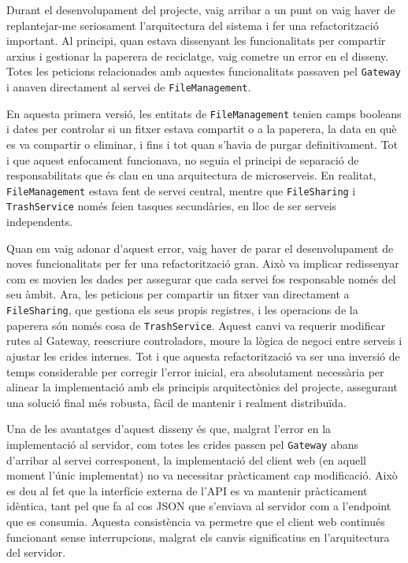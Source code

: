 Durant el desenvolupament del projecte, vaig arribar a un punt on vaig haver de replantejar-me seriosament l'arquitectura del sistema i fer una refactorització important. Al principi, quan estava dissenyant les funcionalitats per compartir arxius i gestionar la paperera de reciclatge, vaig cometre un error en el disseny. Totes les peticions relacionades amb aquestes funcionalitats passaven pel \texttt{Gateway} i anaven directament al servei de \texttt{FileManagement}.

En aquesta primera versió, les entitats de \texttt{FileManagement} tenien camps booleans i dates per controlar si un fitxer estava compartit o a la paperera, la data en què es va compartir o eliminar, i fins i tot quan s'havia de purgar definitivament. Tot i que aquest enfocament funcionava, no seguia el principi de separació de responsabilitats que és clau en una arquitectura de microserveis. En realitat, \texttt{FileManagement} estava fent de servei central, mentre que \texttt{FileSharing} i \texttt{TrashService} només feien tasques secundàries, en lloc de ser serveis independents.

Quan em vaig adonar d'aquest error, vaig haver de parar el desenvolupament de noves funcionalitats per fer una refactorització gran. Això va implicar redissenyar com es movien les dades per assegurar que cada servei fos responsable només del seu àmbit. Ara, les peticions per compartir un fitxer van directament a \texttt{FileSharing}, que gestiona els seus propis registres, i les operacions de la paperera són només cosa de \texttt{TrashService}. Aquest canvi va requerir modificar rutes al Gateway, reescriure controladors, moure la lògica de negoci entre serveis i ajustar les crides internes. Tot i que aquesta refactorització va ser una inversió de temps considerable per corregir l'error inicial, era absolutament necessària per alinear la implementació amb els principis arquitectònics del projecte, assegurant una solució final més robusta, fàcil de mantenir i realment distribuïda.

Una de les avantatges d'aquest disseny és que, malgrat l'error en la implementació al servidor, com totes les crides passen pel \texttt{Gateway} abans d'arribar al servei corresponent, la implementació del client web (en aquell moment l'únic implementat) no va necessitar pràcticament cap modificació. Això es deu al fet que la interfície externa de l'API es va mantenir pràcticament idèntica, tant pel que fa al cos JSON que s'enviava al servidor com a l'endpoint que es consumia. Aquesta consistència va permetre que el client web continués funcionant sense interrupcions, malgrat els canvis significatius en l'arquitectura del servidor.

